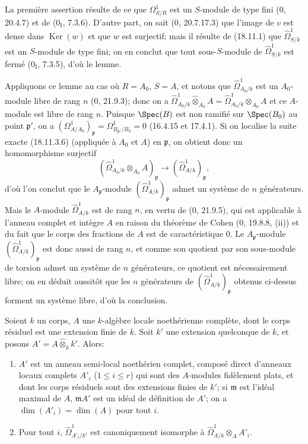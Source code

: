 La première assertion résulte de ce que $\Omega^1_{S/R}$ est un $S$-module de type fini (0, 20.4.7) et de ($0_{\mathrm I}$, 7.3.6). D'autre part, on sait (0, 20.7.17.3) que l'image de $v$ est dense dans $\operatorname{Ker}(w)$ et que $w$ est surjectif; mais il résulte de (18.11.1) que $\hat{\Omega}^1_{S/k}$ est un $S$-module de type fini; on en conclut que tout sous-$S$-module de $\hat{\Omega}^1_{S/k}$ est fermé ($0_{\mathrm I}$, 7.3.5), d'où le lemme.

Appliquons ce lemme au cas où $R=A_0$, $S=A$, et notons que $\hat{\Omega}^1_{A_0/k}$ est un $A_0$-module libre de rang $n$ (0, 21.9.3); donc on a $\hat{\Omega}^1_{A_0/k}\widehat{\otimes}_{A_0}A=\hat{\Omega}^1_{A_0/k}\otimes_{A_0}A$ et ce $A$-module est libre de rang $n$. Puisque $\Spec(B)$ est non ramifié sur $\Spec(B_0)$ au point $\mathfrak p'$, on a $(\Omega^1_{A/A_0})_{\mathfrak p}=\Omega^1_{B_{\mathfrak p'}/B_0}=0$ (16.4.15 et 17.4.1). Si on localise la suite exacte (18.11.3.6) (appliquée à $A_0$ et $A$) en $\mathfrak p$, on obtient donc un homomorphisme surjectif
\[
  (\hat{\Omega}^1_{A_0/k}\otimes_{A_0}A)_{\mathfrak p}\longrightarrow(\hat{\Omega}^1_{A/k})_{\mathfrak p},
\]
d'où l'on conclut que le $A_{\mathfrak p}$-module $(\hat{\Omega}^1_{A/k})_{\mathfrak p}$ admet un système de $n$ générateurs. Mais le $A$-module $\hat{\Omega}^1_{A/k}$ est de rang $n$, en vertu de (0, 21.9.5), qui est applicable à l'anneau complet et intègre $A$ en raison du théorème de Cohen (0, 19.8.8, (ii)) et du fait que le corps des fractions de $A$ est de caractéristique 0. Le $A_{\mathfrak p}$-module $(\hat{\Omega}^1_{A/k})_{\mathfrak p}$ est donc aussi de rang $n$, et comme son quotient par son sous-module de torsion admet un système de $n$ générateurs, ce quotient est nécessairement libre; on en déduit aussitôt que les $n$ générateurs de $(\hat{\Omega}^1_{A/k})_{\mathfrak p}$ obtenus ci-dessus forment un système libre, d'où la conclusion.

\begin{lemma}[18.11.4]
\label{IV.18.11.4}
Soient $k$ un corps, $A$ une $k$-algèbre locale noethérienne complète, dont le corps résiduel est une extension finie de $k$. Soit $k'$ une extension quelconque de $k$, et posons $A'=A\widehat{\otimes}_k k'$. Alors:
\begin{enumerate}
  \item[(i)] $A'$ est un anneau semi-local noethérien complet, composé direct d'anneaux locaux complets $A'_i$ ($1\leq i\leq r$) qui sont des $A$-modules fidèlement plats, et dont les corps résiduels sont des extensions finies de $k'$; si $\mathfrak m$ est l'idéal maximal de $A$, $\mathfrak mA'$ est un idéal de définition de $A'$; on a $\dim(A'_i)=\dim(A)$ pour tout $i$.
  \item[(ii)] Pour tout $i$, $\hat{\Omega}^1_{A'_i/k'}$ est canoniquement isomorphe à $\hat{\Omega}^1_{A/k}\otimes_A A'_i$.
\end{enumerate}
\end{lemma}

